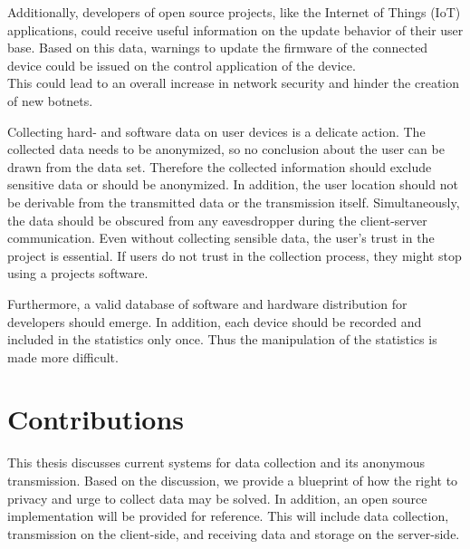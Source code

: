 Additionally, developers of open source projects, like the Internet of Things (IoT) applications, could receive useful
information on the update behavior of their user base. Based on this data, warnings to update the firmware of the
connected device could be issued on the control application of the device.\\
This could lead to an overall increase in network security and hinder the creation of new botnets.\\

\newpage

Collecting hard- and software data on user devices is a delicate action. The collected data needs to be anonymized,
so no conclusion about the user can be drawn from the data set. Therefore the collected information should exclude
sensitive data or should be anonymized. 
In addition, the user location should not be derivable from the transmitted data or the transmission itself. Simultaneously, the data should be obscured from any eavesdropper during the client-server communication. Even without collecting sensible data, the user's trust in the project is essential. If users do not trust in the collection process, they might stop using a projects software.

Furthermore, a valid database of software and hardware distribution for developers should emerge. In addition,
each device should be recorded and included in the statistics only once.
Thus the manipulation of the statistics is made more difficult.



\section{Contributions}
\label{sec:intro:contrib}
%

This thesis discusses current systems for data collection and its anonymous transmission. Based on the discussion, we provide a blueprint of how the right to privacy and urge to collect data may be solved.
In addition, an open source implementation will be provided for reference.
This will include data collection, transmission on the client-side, and receiving data and storage on the server-side.

